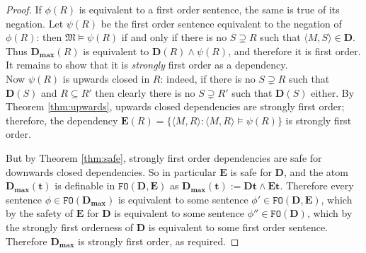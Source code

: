 \documentclass{article}
\theoremstyle{definition}
\newcommand{\tuple}{\mathbf}
\newcommand{\FO}{\texttt{FO}}
\newcommand{\M}{\mathfrak M}
\newcommand{\D}{\mathbf D}
\newcommand{\E}{\mathbf E}
\newcommand{\Dmax}{\mathbf D_{\textbf{max}}}
\begin{document}
\begin{proof}
	If $\phi(R)$ is equivalent to a first order sentence, the same is true of its negation. Let $\psi(R)$ be the first order sentence equivalent to the negation of $\phi(R)$: then $\M \models \psi(R)$ if and only if there is no $S \supsetneq R$ such that $\langle M, S\rangle \in \D$.
	Thus $\Dmax(R)$ is equivalent to $\D(R) \wedge \psi(R)$, and therefore it is first order. It remains to show that it is \emph{strongly} first order as a dependency.\\

	 Now $\psi(R)$ is upwards closed in $R$: indeed, if there is no $S \supsetneq R$ such that $\D(S)$ and $R \subseteq R'$ then clearly there is no $S \supsetneq R'$ such that $\D(S)$ either. By Theorem \ref{thm:upwards}, upwards closed dependencies are strongly first order; therefore, the dependency $\E(R) = \{\langle M, R\rangle: \langle M, R\rangle \models \psi(R)\}$ is strongly first order. 

 But by Theorem \ref{thm:safe}, strongly first order dependencies are safe for downwards closed dependencies. So in particular $\E$ is safe for $\D$, and the atom $\Dmax(\tuple t)$ is definable in $\FO(\D, \E)$ as $\Dmax(\tuple t) := \D \tuple t \wedge \E\tuple t$. Therefore every sentence $\phi \in \FO(\Dmax)$ is equivalent to some sentence $\phi' \in \FO(\D, \E)$, which by the safety of $\E$ for $\D$ is equivalent to some sentence $\phi'' \in \FO(\D)$, which by the strongly first orderness of $\D$ is equivalent to some first order sentence. Therefore $\Dmax$ is strongly first order, as required.
\end{proof}
\end{document}
